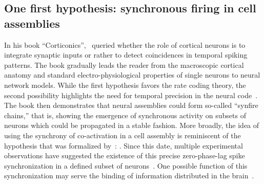 \documentclass[brainsci, %
               review,submit,pdftex,moreauthors
               ]{Definitions/mdpi}
\begin{document}
\subsection{One first hypothesis: synchronous firing in cell assemblies}
%
In his book ``Corticonics'',~\citet{abeles_corticonics_1991} queried whether the role of cortical neurons is to integrate synaptic inputs or rather to detect coincidences in temporal spiking patterns. The book gradually leads the reader from the macroscopic cortical anatomy and standard electro-physiological properties of single neurons to neural network models. While the first hypothesis favors the rate coding theory, the second possibility highlights the need for temporal precision in the neural code~\citep{abeles_role_1982,paugam-moisy_computing_2012}. The book then demonstrates that neural assemblies could form so-called ``synfire chains,'' that is, showing the emergence of synchronous activity on subsets of neurons which could be propagated in a stable fashion. More broadly, the idea of using the synchrony of co-activation in a cell assembly is reminiscent of the hypothesis that was formalized by~\citet{hebb_organization_1949}: . Since this date, multiple experimental observations have suggested the existence of this precise zero-phase-lag spike synchronization in a defined subset of neurons~\citep{harris_organization_2003}. One possible function of this synchronization may serve the binding of information distributed in the brain~\citep{singer_visual_1995, roelfsema_visuomotor_1997}.
\end{document}
